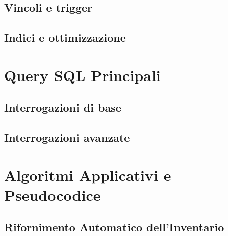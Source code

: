\documentclass[12pt, a4paper, twoside, openright]{article}
\begin{document}
\subsection{Vincoli e trigger}


\subsection{Indici e ottimizzazione}


\newpage

\section{Query SQL Principali}
\minitoc
\vspace{1cm}

\subsection{Interrogazioni di base}


\subsection{Interrogazioni avanzate}


\newpage

\section{Algoritmi Applicativi e Pseudocodice}
\minitoc
\vspace{1cm}

\subsection{Rifornimento Automatico dell'Inventario}
\end{document}
